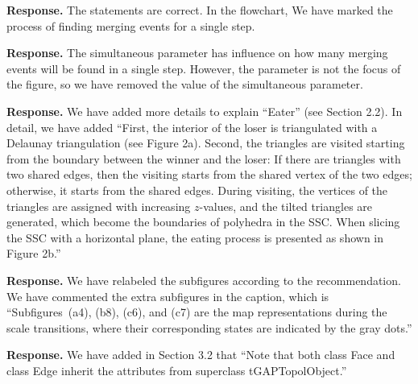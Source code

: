 \documentclass[a4paper,twoside,11pt]{reviewresponse}
\begin{document}
\textbf{Response.}
The statements are correct.
In the flowchart,
We have marked the process of finding merging events for a single step.


\textbf{Response.}
The simultaneous parameter has influence on 
how many merging events will be found in a single step.
However, the parameter is not the focus of the figure,
so we have removed the value of the simultaneous parameter.


\textbf{Response.}
We have added more details to explain ``Eater''
(see Section 2.2).
In detail, we have added
``First, the interior of the loser is triangulated
with a Delaunay triangulation
(see Figure 2a).
Second, the triangles are visited starting from the boundary
between the winner and the loser:
If there are triangles with two shared edges, 
then the visiting starts from the shared vertex of the two edges;
otherwise, it starts from the shared edges.
During visiting, the vertices of the triangles 
are assigned with increasing $z$-values,
and the tilted triangles are generated,
which become the boundaries of polyhedra in the SSC.
When slicing the SSC with a horizontal plane,
the eating process is presented as shown in Figure 2b.''

\textbf{Response.}
We have relabeled the subfigures according to the recommendation. 
We have commented the extra subfigures in the caption,
which is
``Subfigures~(a4), (b8), (c6), and (c7) 
are the map representations during the scale transitions,
where their corresponding states are indicated by the gray dots.''



\textbf{Response.}
We have added in Section 3.2 that
``Note that both class Face and class Edge inherit
 the attributes from superclass tGAPTopolObject.''
\end{document}
